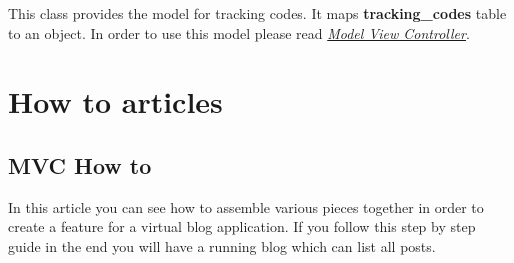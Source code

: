 \documentclass[letterpaper,10pt,english]{sphinxmanual}
\begin{document}

\begin{fulllineitems}
\label{features/components/tracking_codes/tracking_codes:fantastico.contrib.tracking_codes.models.codes.TrackingCode}
This class provides the model for tracking codes. It maps \textbf{tracking\_codes} table to an object. In order to use this model
please read {\hyperref[features/mvc::doc]{\emph{Model View Controller}}}.

\end{fulllineitems}



\chapter{How to articles}
\label{how_to/how_to:how-to-articles}\label{how_to/how_to::doc}

\section{MVC How to}
\label{how_to/mvc_how_to::doc}\label{how_to/mvc_how_to:mvc-how-to}
In this article you can see how to assemble various pieces together in order to create a feature for a virtual blog application.
If you follow this step by step guide in the end you will have a running blog which can list all posts.
\end{document}
